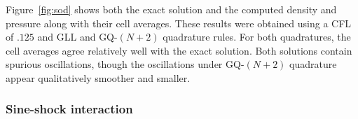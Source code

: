 \documentclass[preprint,10pt]{elsarticle}
\theoremstyle{definition}
\theoremstyle{lemma}
\theoremstyle{theorem}
\theoremstyle{assumption}
\newcommand{\note}[1]{{\color{blue}{#1}}}
\begin{document}
Figure~\ref{fig:sod} shows both the exact solution and the computed density and pressure along with their cell averages.  These results were obtained using a CFL of $.125$ and GLL and GQ-$(N+2)$ quadrature rules.  For both quadratures, the cell averages agree relatively well with the exact solution.  Both solutions contain spurious oscillations, though the oscillations under GQ-$(N+2)$ quadrature appear qualitatively smoother and smaller.  


\subsubsection{Sine-shock interaction}
\label{sec:sineshock}
\end{document}
